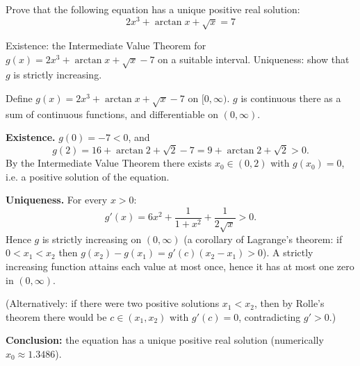 
\begin{question}
Prove that the following equation has a unique positive real solution:
\[ 2x^3+\arctan x+\sqrt{x}=7 \]
\end{question}

\begin{hint}
Existence: the Intermediate Value Theorem for $g(x)=2x^3+\arctan x+\sqrt x-7$ on a suitable interval. Uniqueness: show that $g$ is strictly increasing.
\end{hint}

\begin{solution}
Define $g(x)=2x^3+\arctan x+\sqrt x-7$ on $[0,\infty)$. $g$ is continuous there as a sum of continuous functions, and differentiable on $(0,\infty)$.

\textbf{Existence.} $g(0)=-7<0$, and
\[ g(2)=16+\arctan2+\sqrt2-7=9+\arctan 2+\sqrt2>0. \]
By the Intermediate Value Theorem there exists $x_0\in(0,2)$ with $g(x_0)=0$, i.e. a positive solution of the equation.

\textbf{Uniqueness.} For every $x>0$:
\[ g'(x)=6x^2+\frac1{1+x^2}+\frac1{2\sqrt x}>0. \]
Hence $g$ is strictly increasing on $(0,\infty)$ (a corollary of Lagrange's theorem: if $0<x_1<x_2$ then $g(x_2)-g(x_1)=g'(c)(x_2-x_1)>0$). A strictly increasing function attains each value at most once, hence it has at most one zero in $(0,\infty)$.

(Alternatively: if there were two positive solutions $x_1<x_2$, then by Rolle's theorem there would be $c\in(x_1,x_2)$ with $g'(c)=0$, contradicting $g'>0$.)

\textbf{Conclusion:} the equation has a unique positive real solution (numerically $x_0\approx1.3486$).
\end{solution}
